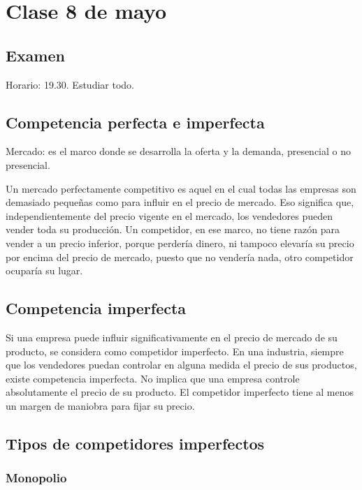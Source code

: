 \section{Clase 8 de mayo}

\subsection{Examen}

Horario: 19.30.
Estudiar todo.

\subsection{Competencia perfecta e imperfecta}

Mercado: 
es el marco donde se desarrolla la oferta y la demanda,
presencial o no presencial.

Un mercado perfectamente competitivo es aquel en el cual 
todas las empresas son demasiado pequeñas
como para influir en el precio de mercado.
Eso significa que,
independientemente del precio vigente en el mercado,
los vendedores pueden vender toda su producción.
Un competidor, en ese marco,
no tiene razón para vender a un precio inferior,
porque perdería dinero,
ni tampoco elevaría su precio por encima del precio de mercado,
puesto que no vendería nada,
otro competidor ocuparía su lugar.

\subsection{Competencia imperfecta}

Si una empresa puede influir significativamente en el precio de mercado 
de su producto,
se considera como competidor imperfecto.
En una industria, 
siempre que los vendedores puedan controlar en alguna medida 
el precio de sus productos,
existe competencia imperfecta.
No implica que una empresa controle absolutamente el precio de su producto.
El competidor imperfecto tiene al menos 
un margen de maniobra para fijar su precio.

\subsection{Tipos de competidores imperfectos}

\subsubsection{Monopolio}

